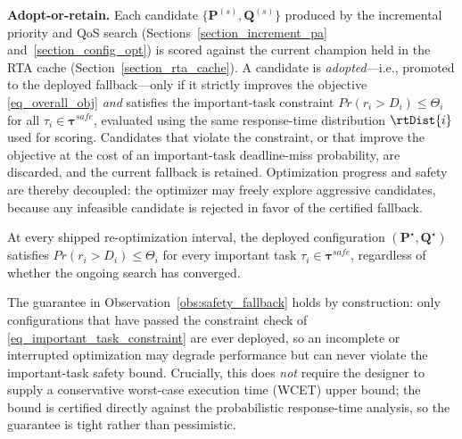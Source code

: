     \textbf{Adopt-or-retain.}
    Each candidate $\{\boldsymbol{P}^{(s)},\boldsymbol{Q}^{(s)}\}$ produced by the incremental priority and QoS search (Sections~\ref{section_increment_pa} and~\ref{section_config_opt}) is scored against the current champion held in the RTA cache (Section~\ref{section_rta_cache}).
    A candidate is \emph{adopted}---i.e., promoted to the deployed fallback---only if it strictly improves the objective \eqref{eq_overall_obj} \emph{and} satisfies the important-task constraint $Pr(r_i > D_i) \leq \Theta_i$ for all $\tau_i \in \boldsymbol{\tau}^{safe}$, evaluated using the same response-time distribution $\rtDist{i}$ used for scoring.
    Candidates that violate the constraint, or that improve the objective at the cost of an important-task deadline-miss probability, are discarded, and the current fallback is retained.
    Optimization progress and safety are thereby decoupled: the optimizer may freely explore aggressive candidates, because any infeasible candidate is rejected in favor of the certified fallback.

    \begin{observation}
    \label{obs:safety_fallback}
    At every shipped re-optimization interval, the deployed configuration $(\boldsymbol{P}^{\star},\boldsymbol{Q}^{\star})$ satisfies $Pr(r_i > D_i) \leq \Theta_i$ for every important task $\tau_i \in \boldsymbol{\tau}^{safe}$, regardless of whether the ongoing search has converged.
    \end{observation}

    The guarantee in Observation~\ref{obs:safety_fallback} holds by construction: only configurations that have passed the constraint check of \eqref{eq_important_task_constraint} are ever deployed, so an incomplete or interrupted optimization may degrade performance but can never violate the important-task safety bound.
    Crucially, this does \emph{not} require the designer to supply a conservative worst-case execution time (WCET) upper bound; the bound is certified directly against the probabilistic response-time analysis, so the guarantee is tight rather than pessimistic.
